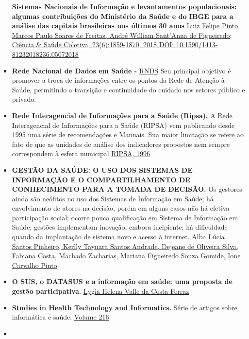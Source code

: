 \documentclass[]{book}
\begin{document}
\begin{itemize}
  \textbf{Sistemas Nacionais de Informação e levantamentos populacionais: algumas contribuições do Ministério da Saúde e do IBGE para a análise das capitais brasileiras nos últimos 30 anos} \href{http://www.scielo.br/pdf/csc/v23n6/1413-8123-csc-23-06-1859.pdf}{Luiz Felipe Pinto, Marcos Paulo Soares de Freitas, André William Sant'Anna de Figueiredo; Ciência \& Saúde Coletiva, 23(6):1859-1870, 2018 DOI: 10.1590/1413-81232018236.05072018}
\item
  \textbf{Rede Nacional de Dados em Saúde - } \href{http://datasus.saude.gov.br/uncategorized/ministerio-da-saude-lanca-a-rede-nacional-de-dados-em-saude-e-datasus-realiza-encontro-tecnico/}{RNDS} Seu principal objetivo é promover a troca de informações entre os pontos da Rede de Atenção à Saúde, permitindo a transição e continuidade do cuidado nos setores público e privado.
\item
  \textbf{Rede Interagencial de Informações para a Saúde (Ripsa).} A Rede Interagencial de Informações para a Saúde (RIPSA) vem publicando desde 1995 uma série de recomendações e Manuais. Sua maior limitação se refere ao fato de que as unidades de análise dos indicadores propostos nem sempre correspondem à esfera municipal \href{http://www.ripsa.org.br/vhl/metodologia-ripsa/concepcao-e-estruturacao/}{RIPSA, 1996}
\item
  \textbf{GESTÃO DA SAÚDE: O USO DOS SISTEMAS DE INFORMAÇÃO E O COMPARTILHAMENTO DE CONHECIMENTO PARA A TOMADA DE DECISÃO.} Os gestores ainda são neófitos no uso dos Sistemas de Informação em Saúde; há envolvimento de atores na decisão, porém em alguns casos não há efetiva participação social; ocorre pouca qualificação em Sistema de Informação em Saúde; gestões implementam inovação, embora incipiente; há dificuldade quando da implantação de sistema novo e acesso à internet. \href{http://www.scielo.br/pdf/tce/v25n3/pt_0104-0707-tce-25-03-3440015.pdf}{Alba Lúcia Santos Pinheiro, Kerlly Taynara Santos Andrade, Dejeane de Oliveira Silva, Fabiana Costa, Machado Zacharias, Mariana Figueiredo Souza Gomide, Ione Carvalho Pinto}
\item
  \textbf{O SUS, o DATASUS e a informação em saúde: uma proposta de gestão participativa.} \href{https://bvssp.icict.fiocruz.br/pdf/25885_ferrazlhvcm.pdf}{Lygia Helena Valle da Costa Ferraz}
\item
  \textbf{Studies in Health Technology and Informatics.} Série de artigos sobre informática e saúde. \href{http://ebooks.iospress.nl/publication/40579}{Volume 216}
\item

\end{itemize}
\end{document}

